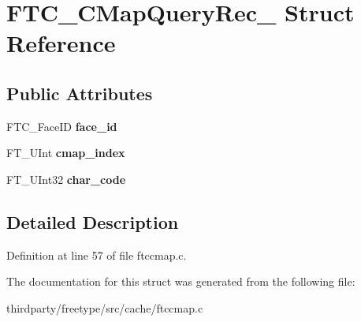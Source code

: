 \hypertarget{struct_f_t_c___c_map_query_rec__}{}\section{F\+T\+C\+\_\+\+C\+Map\+Query\+Rec\+\_\+ Struct Reference}
\label{struct_f_t_c___c_map_query_rec__}
\subsection*{Public Attributes}
\begin{DoxyCompactItemize}
\item 
\mbox{\label{struct_f_t_c___c_map_query_rec___afc79e3d09ae71f3ae93abcb4663fd556}} 
F\+T\+C\+\_\+\+Face\+ID {\bfseries face\+\_\+id}
\item 
\mbox{\label{struct_f_t_c___c_map_query_rec___ab494e49a868f943f88a6cddcb22434ef}} 
F\+T\+\_\+\+U\+Int {\bfseries cmap\+\_\+index}
\item 
\mbox{\label{struct_f_t_c___c_map_query_rec___ad943d0c1bfbff84ce7d631faa0dbc18e}} 
F\+T\+\_\+\+U\+Int32 {\bfseries char\+\_\+code}
\end{DoxyCompactItemize}


\subsection{Detailed Description}


Definition at line 57 of file ftccmap.\+c.



The documentation for this struct was generated from the following file\+:\begin{DoxyCompactItemize}
\item 
thirdparty/freetype/src/cache/ftccmap.\+c\end{DoxyCompactItemize}
